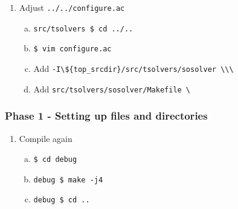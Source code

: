 \begin{frame}[fragile]
  \vfill\pause

  \begin{enumerate}[6.]

    \item Adjust \verb|../../configure.ac|

    \begin{enumerate}[a.]

      \item \verb|src/tsolvers $ cd ../..|

      \item \verb|$ vim configure.ac|

      \item Add \verb|-I\${top_srcdir}/src/tsolvers/sosolver \\\| 

      \item Add \verb|src/tsolvers/sosolver/Makefile \|

    \end{enumerate}

  \end{enumerate}

\end{frame}

\begin{frame}[fragile]
  \frametitle{Phase 1 - Setting up files and directories}

  \vfill

  \begin{enumerate}[7.]

    \item Compile again

    \begin{enumerate}[a.]

      \item \verb|$ cd debug|

      \item \verb|debug $ make -j4|

      \item \verb|debug $ cd ..|

    \end{enumerate}

  \end{enumerate}

  \vfill
  
\end{frame}
